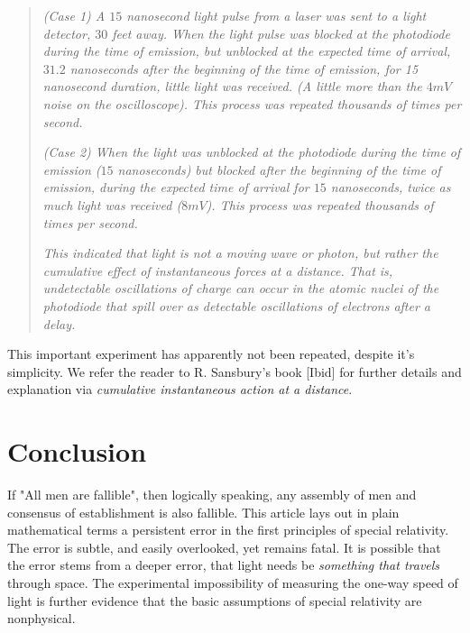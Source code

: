 \documentclass[12pt]{amsart}
\theoremstyle{definition}
\theoremstyle{remark}
\begin{document}
\begin{quote}
\emph{ (Case 1) A $15$ nanosecond light pulse from a laser was sent to a light detector, $30$ feet away. When the light pulse was blocked at the photodiode during the time of emission, but unblocked at the expected time of arrival, $31.2$ nanoseconds after the beginning of the time of emission, for 15 nanosecond duration, little light was received. (A little more than the $4mV$ noise on the oscilloscope). This process was repeated thousands of times per second.}

\emph{(Case 2) When the light was unblocked at the photodiode during the time of emission ($15$ nanoseconds) but blocked after the beginning of the time of emission, during the expected time of arrival for $15$ nanoseconds, twice as much light was received ($8mV$). This process was repeated thousands of times per second.}

\emph{This indicated that light is not a moving wave or photon, but rather the cumulative effect of instantaneous forces at a distance. That is, undetectable oscillations of charge can occur in the atomic nuclei of the photodiode that spill over as detectable oscillations of electrons after a delay.}
\end{quote}

This important experiment has apparently not been repeated, despite it's simplicity. We refer the reader to R. Sansbury's book [Ibid] for further details and explanation via \emph{cumulative instantaneous action at a distance}. 

\section{Conclusion}
If "All men are fallible", then logically speaking, any assembly of men and consensus of establishment is also fallible.   This article lays out in plain mathematical terms a persistent error in the first principles of special relativity. The error is subtle, and easily overlooked, yet remains fatal. It is possible that the error stems from a deeper error, that light needs be \emph{something that travels} through space. The experimental impossibility of measuring the one-way speed of light is further evidence that the basic assumptions of special relativity are nonphysical. 

\end{document}

